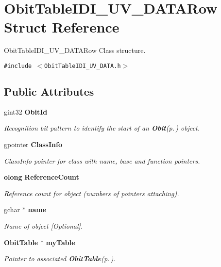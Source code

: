 \section{Obit\-Table\-IDI\_\-UV\_\-DATARow Struct Reference}
\label{structObitTableIDI__UV__DATARow}
Obit\-Table\-IDI\_\-UV\_\-DATARow Class structure.  


{\tt \#include $<$Obit\-Table\-IDI\_\-UV\_\-DATA.h$>$}

\subsection*{Public Attributes}
\begin{CompactItemize}
\item 
gint32 {\bf Obit\-Id}
\begin{CompactList}\small\item\em Recognition bit pattern to identify the start of an {\bf Obit}{\rm (p.\,\pageref{structObit})} object. \item\end{CompactList}\item 
gpointer {\bf Class\-Info}
\begin{CompactList}\small\item\em Class\-Info pointer for class with name, base and function pointers. \item\end{CompactList}\item 
{\bf olong} {\bf Reference\-Count}
\begin{CompactList}\small\item\em Reference count for object (numbers of pointers attaching). \item\end{CompactList}\item 
gchar $\ast$ {\bf name}
\begin{CompactList}\small\item\em Name of object [Optional]. \item\end{CompactList}\item 
{\bf Obit\-Table} $\ast$ {\bf my\-Table}
\begin{CompactList}\small\item\em Pointer to associated {\bf Obit\-Table}{\rm (p.\,\pageref{structObitTable})}. \item\end{CompactList}\item 

\end{CompactItemize}

